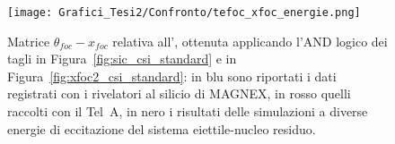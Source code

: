 








\begin{figure} [!p]
	\centering
	\texttt{[image: Grafici\_Tesi2/Confronto/tefoc\_xfoc\_energie.png]}
	\caption{Matrice $\theta_{foc} - x_{foc}$ relativa all', ottenuta applicando l'AND logico dei tagli in Figura~\ref{fig:sic_csi_standard} e in Figura~\ref{fig:xfoc2_csi_standard}: in blu sono riportati i dati registrati con i rivelatori al silicio di MAGNEX, in rosso quelli raccolti con il Tel~A, in nero i risultati delle simulazioni a diverse energie di eccitazione del sistema eiettile-nucleo residuo.} \label{fig:tefoc_xfoc}
\end{figure}








\section{}




